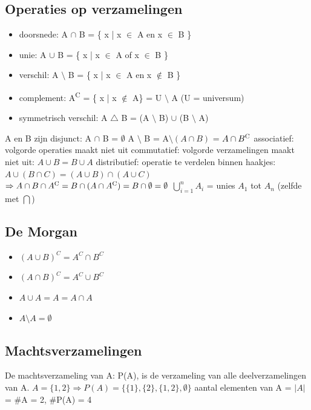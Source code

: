 \documentclass{article}
\begin{document}
\subsection{Operaties op verzamelingen}
\begin{itemize}
    \item doorsnede: A $\cap$ B = \{ x \big| x $\in$ A en x $\in$ B \}
    \item unie: A $\cup$ B = \{ x \big| x $\in$ A of x $\in$ B \}
    \item verschil: A $\setminus$ B = \{ x \big| x $\in$ A en x $\notin$ B \}
    \item complement: A\textsuperscript{C} = \{ x \big| x $\notin$ A\} = U $\setminus$ A (U = universum)
    \item symmetrisch verschil: A $\bigtriangleup$ B = (A $\setminus$ B) $\cup$ (B $\setminus$ A)
\end{itemize}
A en B zijn disjunct: A $\cap$ B = $\emptyset$ \newline
A $\setminus$ B = A$\setminus(A \cap B)$ = $A \cap B\textsuperscript{C}$ \newline
associatief: volgorde operaties maakt niet uit \newline
commutatief: volgorde verzamelingen maakt niet uit: $A \cup B = B \cup A$ \newline
distributief: operatie te verdelen binnen haakjes: $A \cup (B \cap C) = (A \cup B) \cap (A \cup C)$ \newline $\Rightarrow A \cap B \cap A\textsuperscript{C} = B \cap (A \cap A\textsuperscript{C}) = B \cap \emptyset = \emptyset$ \newline
$\bigcup_{i=1}^{n} A_{i}$ = unies $A_{1}$ tot $A_{n}$ (zelfde met $\bigcap$) \newline

\subsection{De Morgan}
\begin{itemize}
    \item $(A \cup B)^C = A^C \cap B^C$
    \item $(A \cap B)^C = A^C \cup B^C$
    \item $A \cup A = A = A \cap A$
    \item $A \setminus A = \emptyset$
\end{itemize}

\subsection{Machtsverzamelingen}
De machtsverzameling van A: P(A), is de verzameling van alle deelverzamelingen van A. \newline
    $A = \{1,2\} \Rightarrow P(A) = \{\{1\},\{2\},\{1,2\},\emptyset\}$ \newline
aantal elementen van A = $|A|$ = \#A = 2, \#P(A) = 4
\end{document}
